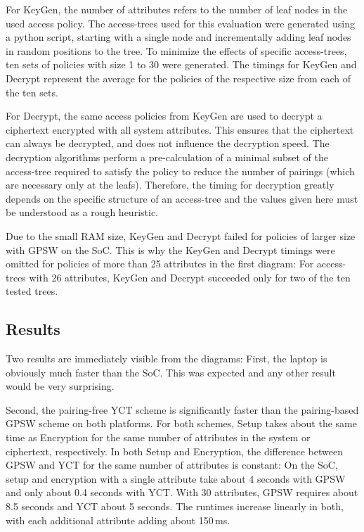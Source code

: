 For KeyGen, the number of attributes refers to the number of leaf nodes in the used access policy.
The \glspl{access-tree} used for this evaluation were generated using a python script, starting with a single node and incrementally adding leaf nodes in random positions to the tree.
To minimize the effects of specific \glspl{access-tree}, ten sets of policies with size 1 to 30 were generated.
The timings for KeyGen and Decrypt represent the average for the policies of the respective size from each of the ten sets.

For Decrypt, the same access policies from KeyGen are used to decrypt a ciphertext encrypted with all system attributes.
This ensures that the ciphertext can always be decrypted, and does not influence the decryption speed.
The decryption algorithms perform a pre-calculation of a minimal subset of the \gls{access-tree} required to satisfy the policy to reduce the number of pairings (which are necessary only at the leafs).
Therefore, the timing for decryption greatly depends on the specific structure of an \gls{access-tree} and the values given here must be understood as a rough heuristic.

Due to the small RAM size, KeyGen and Decrypt failed for policies of larger size with GPSW on the SoC.
This is why the KeyGen and Decrypt timings were omitted for policies of more than 25 attributes in the first diagram:
For \glspl{access-tree} with 26 attributes, KeyGen and Decrypt succeeded only for two of the ten tested trees.

\subsection{Results}
Two results are immediately visible from the diagrams:
First, the laptop is obviously much faster than the SoC.
This was expected and any other result would be very surprising.

Second, the pairing-free YCT scheme is significantly faster than the pairing-based GPSW scheme on both platforms. 
For both schemes, Setup takes about the same time as Encryption for the same number of attributes in the system or ciphertext, respectively.
In both Setup and Encryption, the difference between GPSW and YCT for the same number of attributes is constant:
On the SoC, setup and encryption with a single attribute take about 4 seconds with GPSW and only about 0.4 seconds with YCT.
With 30 attributes, GPSW requires about 8.5 seconds and YCT about 5 seconds.
The runtimes increase linearly in both, with each additional attribute adding about 150\,ms.

